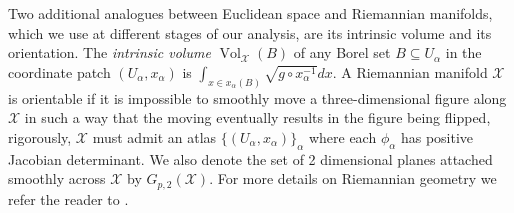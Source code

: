 \documentclass[anon,12pt]{colt2021} %
\newcommand{\xxx}{\mathcal{X}}
\begin{document}
Two additional analogues between Euclidean space and Riemannian manifolds, which we use at different stages of our analysis, are its intrinsic volume and its orientation.  The \textit{intrinsic volume} $\operatorname{Vol}_{\xxx}(B)$ of any Borel set $B\subseteq U_{\alpha}$ in the coordinate patch $(U_{\alpha},x_{\alpha})$ is $\int_{x \in x_{\alpha}(B)} \sqrt{g\circ x_{\alpha}^{-1}} dx$.  A Riemannian manifold $\xxx$ is orientable if it is impossible to smoothly move a three-dimensional figure along $\xxx$ in such a way that the moving eventually results in the figure being flipped, rigorously, $\xxx$ must admit an atlas $\{(U_{\alpha},x_{\alpha})\}_{\alpha}$ where each $\phi_{\alpha}$ has positive Jacobian determinant.  
We also denote the set of 2 dimensional planes attached smoothly across $\xxx$ by $G_{p,2}(\xxx)$.
For more details on Riemannian geometry we refer the reader to \cite{jost2008riemannian}.  
\end{document}
